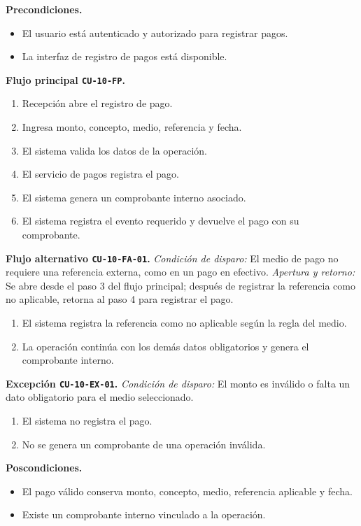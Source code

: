 \documentclass[11pt,a4paper,twoside]{article}
\begin{document}
\textbf{Precondiciones.}
\begin{itemize}
\item El usuario está autenticado y autorizado para registrar pagos.
\item La interfaz de registro de pagos está disponible.
\end{itemize}

\textbf{Flujo principal \texttt{CU-10-FP}.}
\begin{enumerate}
\item Recepción abre el registro de pago.
\item Ingresa monto, concepto, medio, referencia y fecha.
\item El sistema valida los datos de la operación.
\item El servicio de pagos registra el pago.
\item El sistema genera un comprobante interno asociado.
\item El sistema registra el evento requerido y devuelve el pago con su comprobante.
\end{enumerate}

\textbf{Flujo alternativo \texttt{CU-10-FA-01}.} \textit{Condición de disparo:} El medio de pago no requiere una referencia externa, como en un pago en efectivo. \textit{Apertura y retorno:} Se abre desde el paso 3 del flujo principal; después de registrar la referencia como no aplicable, retorna al paso 4 para registrar el pago.
\begin{enumerate}[label=\alph*.]
\item El sistema registra la referencia como no aplicable según la regla del medio.
\item La operación continúa con los demás datos obligatorios y genera el comprobante interno.
\end{enumerate}

\textbf{Excepción \texttt{CU-10-EX-01}.} \textit{Condición de disparo:} El monto es inválido o falta un dato obligatorio para el medio seleccionado.
\begin{enumerate}[label=\alph*.]
\item El sistema no registra el pago.
\item No se genera un comprobante de una operación inválida.
\end{enumerate}

\textbf{Poscondiciones.}
\begin{itemize}
\item El pago válido conserva monto, concepto, medio, referencia aplicable y fecha.
\item Existe un comprobante interno vinculado a la operación.
\end{itemize}
\end{document}
